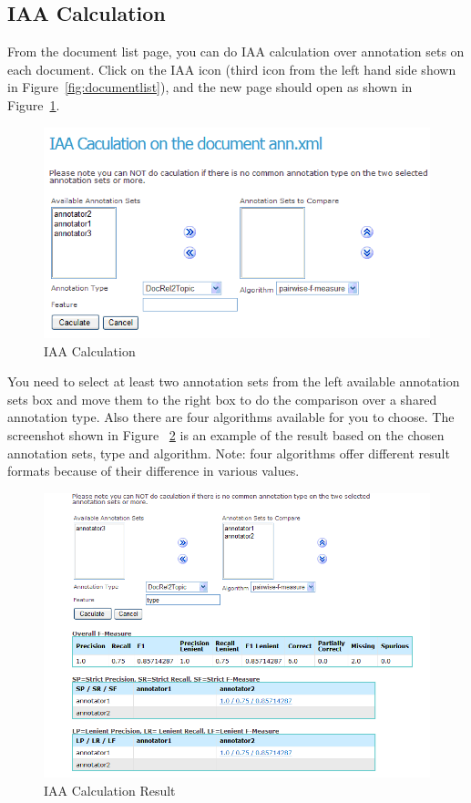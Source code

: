 \subsection{IAA Calculation}
From the document list page, you can do IAA calculation over annotation sets on
each document. Click on the IAA icon (third icon from the left hand side shown
in Figure~\ref{fig:documentlist}), and the new page should open as shown in
Figure~\ref{fig:iaacalculation}.
\begin{figure}[ht!]
\centering
\includegraphics[scale=0.4]{iaacaculation}
\caption{IAA Calculation}
\label{fig:iaacalculation}
\end{figure}

You need to select at least two annotation sets from the left available
annotation sets box and move them to the right box to do the comparison over a
shared annotation type. Also there are four algorithms available for you to choose.
The screenshot shown in Figure ~\ref{fig:iaaresult} is an example of the result
based on the chosen annotation sets, type and algorithm. Note: four algorithms
offer different result formats because of their difference in various values.

\begin{figure}[h!]
\centering
\includegraphics[scale=0.4]{iaaresult}
\caption{IAA Calculation Result}
\label{fig:iaaresult}
\end{figure}

\clearpage